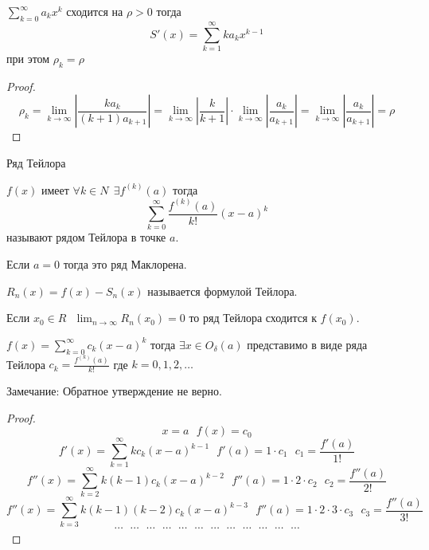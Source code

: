 \begin{block}[Следствие 3]
  $\sum_{k=0}^{\infty} a_k x^k$ сходится на $\rho > 0$ тогда
  $$
  S'(x) = \sum_{k=1}^{\infty}k a_k x^{k-1}
  $$
  при этом $\rho_k = \rho$
\end{block}

\begin{proof}
  $$
  \rho_k = \lim_{k \to \infty} \left| \frac{k a_k}{(k+1)a_{k+1}} \right| =
  \lim_{k \to \infty} \left| \frac{k}{k+1} \right| \cdot
  \lim_{k \to \infty} \left| \frac{a_k}{a_{k+1}} \right| =
  \lim_{k \to \infty} \left| \frac{a_k}{a_{k+1}} \right| = \rho
  $$
\end{proof}

\begin{title}[\Large]
  Ряд Тейлора
\end{title}

\begin{define}
  $f(x)$ имеет $\forall k \in N ~~ \exists f^{(k)}(a)$ тогда
  $$
  \sum_{k=0}^{\infty} \frac{f^{(k)}(a)}{k!} (x-a)^k
  $$
  называют рядом Тейлора в точке $a$.

  Если $a = 0$ тогда это ряд Маклорена.

  $R_n(x) = f(x) - S_n(x)$ называется формулой Тейлора.

  Если $x_0 \in R ~~~ \lim_{n \to \infty} R_n(x_0) = 0$ то ряд Тейлора сходится
  к $f(x_0)$.
\end{define}

\begin{theorem}
  $f(x) = \sum_{k=0}^{\infty} c_k(x-a)^k$ тогда $\exists x \in O_{\delta}(a)$
  представимо в виде ряда Тейлора
  $c_k = \frac{f^{(k)}(a)}{k!}$ где $k = 0,1,2, \ldots$

  Замечание: Обратное утверждение не верно.
\end{theorem}

\begin{proof}
  $$
  x = a ~~~ f(x) = c_0
  $$
  $$
  f'(x) = \sum_{k=1}^{\infty} k c_k(x - a)^{k - 1} ~~~ f'(a) = 1 \cdot c_1 ~~~
  c_1 = \frac{f'(a)}{1!}
  $$
  $$
  f''(x) = \sum_{k=2}^{\infty} k(k-1) c_k (x - a)^{k-2} ~~~
  f''(a) = 1 \cdot 2 \cdot c_2 ~~~ c_2 = \frac{f''(a)}{2!}
  $$
  $$
  f''(x) = \sum_{k=3}^{\infty} k(k-1)(k-2) c_k (x - a)^{k-3} ~~~
  f''(a) = 1 \cdot 2 \cdot 3 \cdot c_3 ~~~ c_3 = \frac{f''(a)}{3!}
  $$
  $$
  \cdots ~~~ \cdots ~~~ \cdots ~~~ \cdots ~~~ \cdots ~~~ \cdots
  ~~~ \cdots ~~~ \cdots ~~~ \cdots ~~~ \cdots ~~~ \cdots ~~~ \cdots
  $$
\end{proof}

